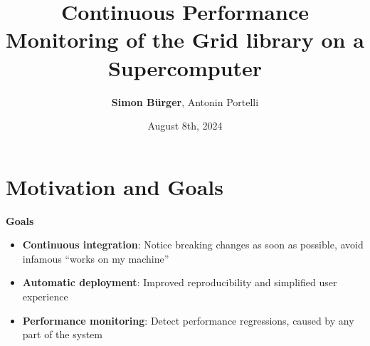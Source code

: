 \documentclass[english,xcolor=pst,11pt]{beamer}
\title{Continuous Performance Monitoring of the Grid library on a Supercomputer}
\author{\textbf{Simon Bürger}, Antonin Portelli}
\date{August 8th, 2024}
\begin{document}
\maketitle

%



\section{Motivation and Goals}

\begin{frame}

\textbf{Goals}
\begin{itemize}
 \item \textbf{Continuous integration}: Notice breaking changes as soon as possible, avoid infamous ``works on my machine''
 \item \textbf{Automatic deployment}: Improved reproducibility and simplified user experience
 \item \textbf{Performance monitoring}: Detect performance regressions, caused by any part of the system
\end{itemize}

\end{frame}
\end{document}
